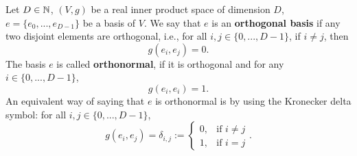 \begin{definition}
  Let
    $D \in \mathbb{N}$,
    $(V, g)$ be a real inner product space of dimension $D$,
    $e = \{e_0, ..., e_{D - 1}\}$ be a basis of $V$.
  We say that $e$ is an \textbf{orthogonal basis} if any two disjoint elements
  are orthogonal, i.e., for all $i, j \in \{0, ..., D - 1\}$,
  if $i \neq j$, then
  \begin{equation}
    g(e_i, e_j) = 0.
  \end{equation}
  The basis $e$ is called \textbf{orthonormal}, if it is orthogonal and
  for any $i \in \{0, ..., D - 1\}$,
  \begin{equation}
     g(e_i, e_i) = 1.
  \end{equation}
  An equivalent way of saying that $e$ is orthonormal is by using the Kronecker
  delta symbol: for all $i, j \in \{0, ..., D - 1\}$,
  \begin{equation}
    g(e_i, e_j) = \delta_{i, j} :=
    \begin{cases}
      0, & \text{if $i \neq j$} \\
      1, & \text{if $i = j$}
    \end{cases}.
  \end{equation}
\end{definition}
